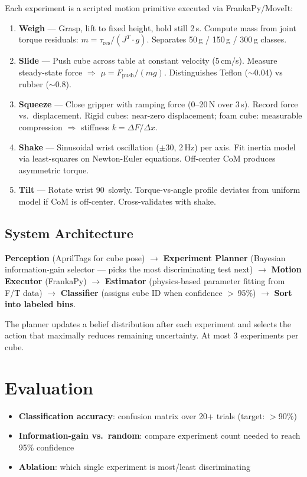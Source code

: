 \documentclass[10pt]{article}
\begin{document}
Each experiment is a scripted motion primitive executed via FrankaPy/MoveIt:

\begin{enumerate}[nosep,leftmargin=*]
    \item \textbf{Weigh} --- Grasp, lift to fixed height, hold still 2\,s. Compute mass from joint torque residuals: $m = \tau_{\text{res}} / (J^T \cdot g)$. Separates 50\,g / 150\,g / 300\,g classes.
    \item \textbf{Slide} --- Push cube across table at constant velocity (5\,cm/s). Measure steady-state force $\Rightarrow$ $\mu = F_{\text{push}} / (mg)$. Distinguishes Teflon ($\sim$0.04) vs rubber ($\sim$0.8).
    \item \textbf{Squeeze} --- Close gripper with ramping force (0--20\,N over 3\,s). Record force vs.\ displacement. Rigid cubes: near-zero displacement; foam cube: measurable compression $\Rightarrow$ stiffness $k = \Delta F / \Delta x$.
    \item \textbf{Shake} --- Sinusoidal wrist oscillation ($\pm$30\textdegree, 2\,Hz) per axis. Fit inertia model via least-squares on Newton-Euler equations. Off-center CoM produces asymmetric torque.
    \item \textbf{Tilt} --- Rotate wrist 90\textdegree\ slowly. Torque-vs-angle profile deviates from uniform model if CoM is off-center. Cross-validates with shake.
\end{enumerate}

\subsection{System Architecture}

\textbf{Perception} (AprilTags for cube pose) $\rightarrow$ \textbf{Experiment Planner} (Bayesian information-gain selector --- picks the most discriminating test next) $\rightarrow$ \textbf{Motion Executor} (FrankaPy) $\rightarrow$ \textbf{Estimator} (physics-based parameter fitting from F/T data) $\rightarrow$ \textbf{Classifier} (assigns cube ID when confidence $>$\,95\%) $\rightarrow$ \textbf{Sort into labeled bins}.

The planner updates a belief distribution after each experiment and selects the action that maximally reduces remaining uncertainty. At most 3 experiments per cube.

\section{Evaluation}
\begin{itemize}[nosep,leftmargin=*]
    \item \textbf{Classification accuracy}: confusion matrix over 20+ trials (target: $>$90\%)
    \item \textbf{Information-gain vs.\ random}: compare experiment count needed to reach 95\% confidence
    \item \textbf{Ablation}: which single experiment is most/least discriminating
\end{itemize}
\end{document}
